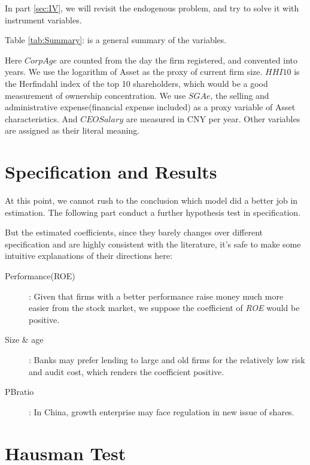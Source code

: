 \documentclass{article}
\begin{document}
In part \ref{sec:IV}, we will revisit the endogenous problem, and try to solve it with instrument variables.

Table \ref{tab:Summary}:  is a general summary of the variables.


Here $CorpAge$ are counted from the day the firm registered, and convented into years. We use the logarithm of Asset as the proxy of current firm size. $HHI10$ is the Herfindahl index of the top 10 shareholders, which would be a good measurement of ownership concentration. We use $SGAe$, the selling and administrative expense(financial expense included) as a proxy variable of Asset characteristics. And $CEO Salary$ are measured in CNY per year. Other variables are assigned as their literal meaning. 
\newpage
\section{Specification and Results} \label{sec:model}

At this point, we cannot rush to the conclusion which model did a better job in estimation. The following part conduct a further hypothesis test in specification.

But the estimated coefficients, since they barely changes over different specification and are highly consistent with the literature, it's safe to make some intuitive explanations of their directions here:
\begin{description}
\item [Performance(ROE)]: Given that firms with a better performance raise money much more easier from the stock market, we suppose the coefficient of {\it ROE} would be positive. 
\item [Size \& age]: Banks may prefer lending to large and old firms for the relatively low risk and audit cost, which renders the coefficient positive.
\item [PBratio]: In China, growth enterprise may face regulation in new issue of shares.
\end{description}

\newpage
\section{Hausman Test}\label{sec:test}
\begin{mdframed}
	\begin{stlog}
	\nullskip
	\end{stlog}
  \end{mdframed}
\end{document}

